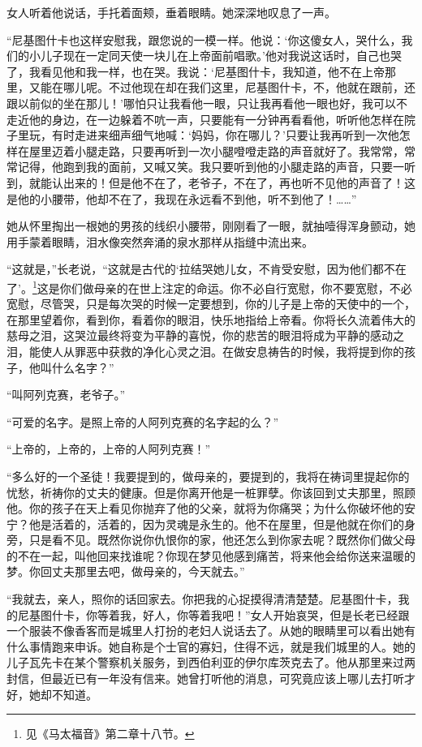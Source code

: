 \par 女人听着他说话，手托着面颊，垂着眼睛。她深深地叹息了一声。
\par “尼基图什卡也这样安慰我，跟您说的一模一样。他说：‘你这傻女人，哭什么，我们的小儿子现在一定同天使一块儿在上帝面前唱歌。’他对我说这话时，自己也哭了，我看见他和我一样，也在哭。我说：‘尼基图什卡，我知道，他不在上帝那里，又能在哪儿呢。不过他现在却在我们这里，尼基图什卡，不，他就在跟前，还跟以前似的坐在那儿！’哪怕只让我看他一眼，只让我再看他一眼也好，我可以不走近他的身边，在一边躲着不吭一声，只要能有一分钟再看看他，听听他怎样在院子里玩，有时走进来细声细气地喊：‘妈妈，你在哪儿？’只要让我再听到一次他怎样在屋里迈着小腿走路，只要再听到一次小腿噔噔走路的声音就好了。我常常，常常记得，他跑到我的面前，又喊又笑。我只要听到他的小腿走路的声音，只要一听到，就能认出来的！但是他不在了，老爷子，不在了，再也听不见他的声音了！这是他的小腰带，他却不在了，我现在永远看不到他，听不到他了！……”
\par 她从怀里掏出一根她的男孩的线织小腰带，刚刚看了一眼，就抽噎得浑身颤动，她用手蒙着眼睛，泪水像突然奔涌的泉水那样从指缝中流出来。
\par “这就是，”长老说，“这就是古代的‘拉结哭她儿女，不肯受安慰，因为他们都不在了’。\footnote{见《马太福音》第二章十八节。}这是你们做母亲的在世上注定的命运。你不必自行宽慰，你不要宽慰，不必宽慰，尽管哭，只是每次哭的时候一定要想到，你的儿子是上帝的天使中的一个，在那里望着你，看到你，看着你的眼泪，快乐地指给上帝看。你将长久流着伟大的慈母之泪，这哭泣最终将变为平静的喜悦，你的悲苦的眼泪将成为平静的感动之泪，能使人从罪恶中获救的净化心灵之泪。在做安息祷告的时候，我将提到你的孩子，他叫什么名字？”
\par “叫阿列克赛，老爷子。”
\par “可爱的名字。是照上帝的人阿列克赛的名字起的么？”
\par “上帝的，上帝的，上帝的人阿列克赛！”
\par “多么好的一个圣徒！我要提到的，做母亲的，要提到的，我将在祷词里提起你的忧愁，祈祷你的丈夫的健康。但是你离开他是一桩罪孽。你该回到丈夫那里，照顾他。你的孩子在天上看见你抛弃了他的父亲，就将为你痛哭；为什么你破坏他的安宁？他是活着的，活着的，因为灵魂是永生的。他不在屋里，但是他就在你们的身旁，只是看不见。既然你说你仇恨你的家，他还怎么到你家去呢？既然你们做父母的不在一起，叫他回来找谁呢？你现在梦见他感到痛苦，将来他会给你送来温暖的梦。你回丈夫那里去吧，做母亲的，今天就去。”
\par “我就去，亲人，照你的话回家去。你把我的心捉摸得清清楚楚。尼基图什卡，我的尼基图什卡，你等着我，好人，你等着我吧！”女人开始哀哭，但是长老已经跟一个服装不像香客而是城里人打扮的老妇人说话去了。从她的眼睛里可以看出她有什么事情跑来申诉。她自称是个士官的寡妇，住得不远，就是我们城里的人。她的儿子瓦先卡在某个警察机关服务，到西伯利亚的伊尔库茨克去了。他从那里来过两封信，但最近已有一年没有信来。她曾打听他的消息，可究竟应该上哪儿去打听才好，她却不知道。

